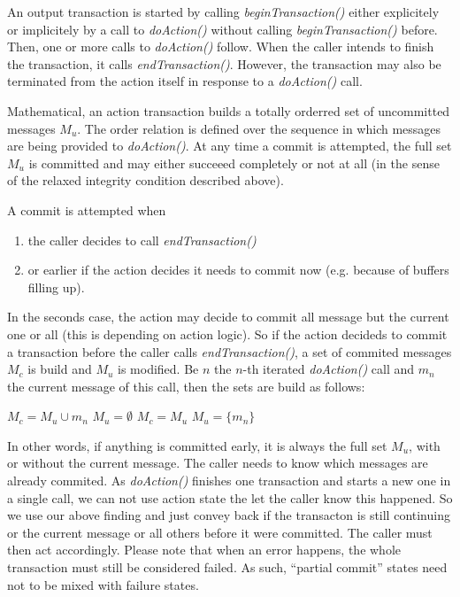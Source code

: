 \documentclass[a4paper,10pt]{article}
\begin{document}
An output transaction is started by calling \emph{beginTransaction()} either explicitely or implicitely by a call to \emph{doAction()} without calling \emph{beginTransaction()} before. Then, one or more calls to \emph{doAction()} follow. When the caller intends to finish the transaction, it calls \emph{endTransaction()}. However, the transaction may also be terminated from the action itself in response to a \emph{doAction()} call.

Mathematical, an action transaction builds a totally orderred set of uncommitted messages $M_u$. The order relation is defined over the sequence in which messages are being provided to \emph{doAction()}. At any time a commit is attempted, the full set $M_u$ is committed and may either succeeed completely or not at all (in the sense of the relaxed integrity condition described above). 

A commit is attempted when 
\begin{enumerate}
\item the caller decides to call \emph{endTransaction()} 
\item or earlier if the action decides it needs to commit now (e.g. because of buffers filling up).
\end{enumerate}

In the seconds case, the action may decide to commit all message but the current one or all (this is depending on action logic). So if the action decideds to commit a transaction before the caller calls \emph{endTransaction()}, a set of commited messages $M_c$ is build and $M_u$ is modified. Be $n$ the $n$-th iterated \emph{doAction()} call and $m_n$ the current message of this call, then the sets are build as follows:

\begin{algorithm}
\begin{algorithmic}
	\STATE $M_c = M_u \cup m_n$
	\STATE $M_u = \emptyset$
\ELSE
	\STATE $M_c = M_u$
	\STATE $M_u = \{ m_n\}$
\ENDIF
\end{algorithmic}
\end{algorithm}

In other words, if anything is committed early, it is always the full set $M_u$, with or without the current message. The caller needs to know which messages are already commited. As \emph{doAction()} finishes one transaction and starts a new one in a single call, we can not use action state the let the caller know this happened. So we use our above finding and just convey back if the transacton is still continuing or the current message or all others before it were committed. The caller must then act accordingly. Please note that when an error happens, the whole transaction must still be considered failed. As such, ``partial commit'' states need not to be mixed with failure states.
\end{document}
